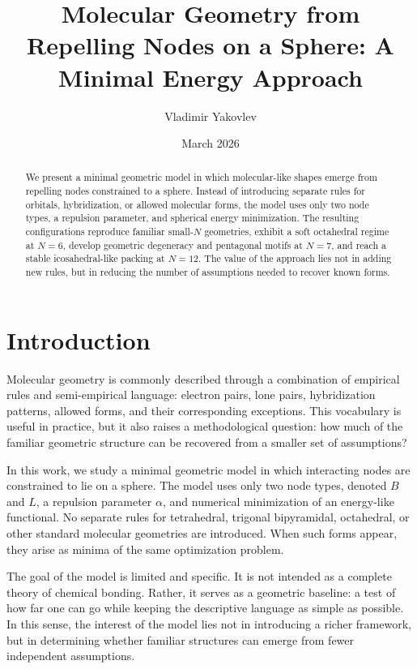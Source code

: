 \documentclass[11pt,a4paper]{article}
\title{Molecular Geometry from Repelling Nodes on a Sphere: A Minimal Energy Approach}
\author{Vladimir Yakovlev}
\date{March 2026}
\begin{document}
\maketitle

\begin{abstract}
We present a minimal geometric model in which molecular-like shapes emerge from repelling nodes constrained to a sphere. Instead of introducing separate rules for orbitals, hybridization, or allowed molecular forms, the model uses only two node types, a repulsion parameter, and spherical energy minimization. The resulting configurations reproduce familiar small-$N$ geometries, exhibit a soft octahedral regime at $N=6$, develop geometric degeneracy and pentagonal motifs at $N=7$, and reach a stable icosahedral-like packing at $N=12$. The value of the approach lies not in adding new rules, but in reducing the number of assumptions needed to recover known forms.
\end{abstract}

\section{Introduction}
Molecular geometry is commonly described through a combination of empirical rules and semi-empirical language: electron pairs, lone pairs, hybridization patterns, allowed forms, and their corresponding exceptions. This vocabulary is useful in practice, but it also raises a methodological question: how much of the familiar geometric structure can be recovered from a smaller set of assumptions?

In this work, we study a minimal geometric model in which interacting nodes are constrained to lie on a sphere. The model uses only two node types, denoted $B$ and $L$, a repulsion parameter $\alpha$, and numerical minimization of an energy-like functional. No separate rules for tetrahedral, trigonal bipyramidal, octahedral, or other standard molecular geometries are introduced. When such forms appear, they arise as minima of the same optimization problem.

The goal of the model is limited and specific. It is not intended as a complete theory of chemical bonding. Rather, it serves as a geometric baseline: a test of how far one can go while keeping the descriptive language as simple as possible. In this sense, the interest of the model lies not in introducing a richer framework, but in determining whether familiar structures can emerge from fewer independent assumptions.
\end{document}
